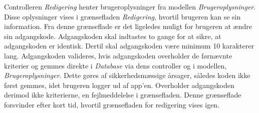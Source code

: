 \noindent
Controlleren \textit{Redigering} henter brugeroplysninger fra modellen \textit{Brugeroplysninger}. Disse oplysninger vises i grænsefladen \textit{Redigering}, hvortil brugeren kan se sin information. Fra denne grænseflade er det ligeledes muligt for brugeren at ændre sin adgangskode. Adgangskoden skal indtastes to gange for at sikre, at adgangskoden er identisk. Dertil skal adgangskoden være minimum 10 karakterer lang. Adgangskoden valideres, hvis adgangskoden overholder de førnævnte kriterier og gemmes direkte i \textit{Database} via dens controller og i modellen, \textit{Brugeroplysninger}. Dette gøres af sikkerhedsmæssige årsager, således koden ikke først gemmes, idet brugeren logger ud af app'en. 
Overholder adgangskoden derimod ikke kriterierne, en fejlmeddelelse i grænsefladen. Denne grænseflade forsvinder efter kort tid, hvortil grænsefladen for redigering vises igen. 
